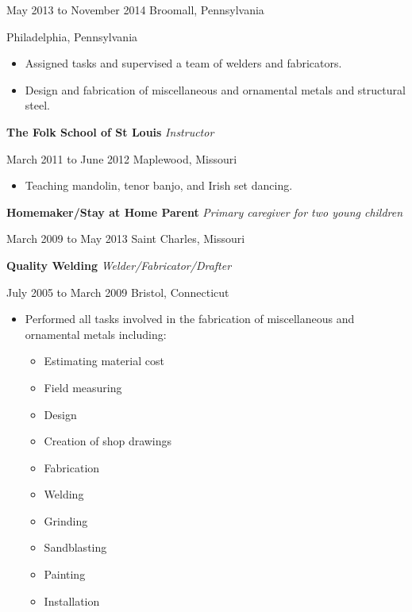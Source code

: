 \documentclass[9pt]{extarticle}
\begin{document}
May 2013 to November 2014 \hfill Broomall, Pennsylvania

\hfill Philadelphia, Pennsylvania

\begin{itemize}
    \item Assigned tasks and supervised a team of welders and fabricators.
    \item Design and fabrication of miscellaneous and ornamental metals and structural steel.
\end{itemize}

\textbf{The Folk School of St Louis} \hfill \textit{Instructor}

March 2011 to June 2012 \hfill Maplewood, Missouri

\begin{itemize}
    \item Teaching mandolin, tenor banjo, and Irish set dancing.
\end{itemize}

\textbf{Homemaker/Stay at Home Parent} \hfill \textit{Primary caregiver for two young children}

March 2009 to May 2013 \hfill Saint Charles, Missouri

\hfill

\textbf{Quality Welding} \hfill \textit{Welder/Fabricator/Drafter}

July 2005 to March 2009 \hfill Bristol, Connecticut

\begin{itemize}
    \item Performed all tasks involved in the fabrication of miscellaneous and ornamental metals including: 
        \begin{multicols}{2}
\begin{itemize}
    \item Estimating material cost 
    \item Field measuring 
    \item Design 
    \item Creation of shop drawings 
    \item Fabrication 
        \columnbreak
    \item Welding 
    \item Grinding 
    \item Sandblasting 
    \item Painting 
    \item Installation
\end{itemize}
\end{multicols}
\end{itemize}
\end{document}
